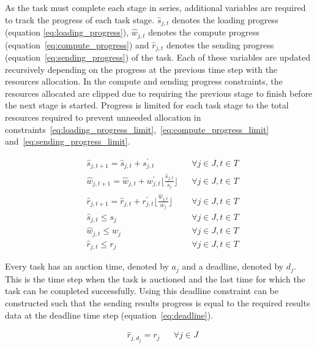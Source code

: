 As the task must complete each stage in series, additional variables are required to track the progress of
each task stage. $\hat{s}_{j,t}$ denotes the loading progress (equation \eqref{eq:loading_progress}), $\hat{w}_{j,t}$
denotes the compute progress (equation~\eqref{eq:compute_progress}) and $\hat{r}_{j,t}$ denotes the sending progress
(equation~\eqref{eq:sending_progress}) of the task. Each of these variables are updated recursively depending
on the progress at the previous time step with the resources allocation. In the compute and sending
progress constraints, the resources allocated are clipped due to requiring the previous stage to finish before the next
stage is started. Progress is limited for each task stage to the total resources required to prevent unneeded
allocation in constraints~\eqref{eq:loading_progress_limit},~\eqref{eq:compute_progress_limit}
and~\eqref{eq:sending_progress_limit}.

\begin{align}
    & \hat{s}_{j,t+1} = \hat{s}_{j,t} + s^{'}_{j,t} && \forall{j \in J, t \in T } \label{eq:loading_progress} \\
    & \hat{w}_{j,t+1} = \hat{w}_{j,t} + w^{'}_{j,t} \lfloor{\frac{\hat{s}_{j,t}}{s_j}}\rfloor && \forall{j \in J, t \in T } \label{eq:compute_progress} \\
    & \hat{r}_{j,t+1} = \hat{r}_{j,t} + r^{'}_{j,t} \lfloor{\frac{\hat{w}_{j,t}}{w_j}}\rfloor && \forall{j \in J, t \in T } \label{eq:sending_progress} \\
    & \hat{s}_{j,t} \leq s_j && \forall{j \in J, t \in T} \label{eq:loading_progress_limit} \\
    & \hat{w}_{j,t} \leq w_j && \forall{j \in J, t \in T} \label{eq:compute_progress_limit} \\
    & \hat{r}_{j,t} \leq r_j && \forall{j \in J, t \in T} \label{eq:sending_progress_limit}
\end{align}

Every task has an auction time, denoted by $a_j$ and a deadline, denoted by $d_j$. This is the time step when the task
is auctioned and the last time for which the task can be completed successfully. Using this deadline constraint can be
constructed such that the sending results progress is equal to the required results data at the deadline time step
(equation~\eqref{eq:deadline}).

\begin{align}
    & \hat{r}_{j, d_j} = r_j && \forall{j \in J} \label{eq:deadline}
\end{align}

